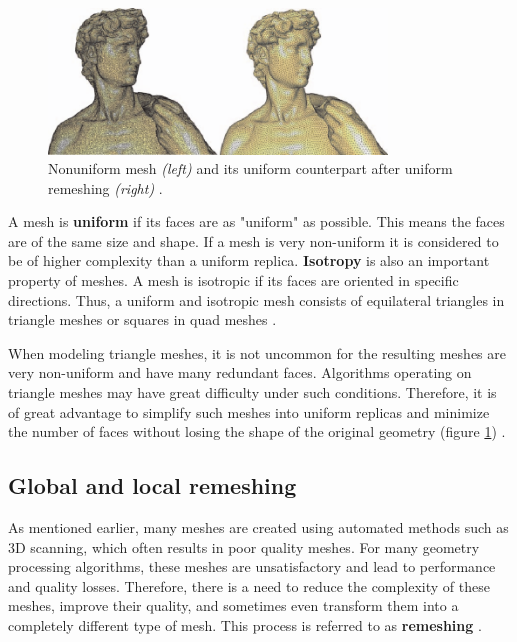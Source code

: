 \documentclass{ACGSeminar}
\begin{document}
\begin{figure}[htb!]
	\begin{centering}
		\includegraphics[width=9cm]{img/Uniform-Mesh.png}\par
	\end{centering}
	\caption{Nonuniform mesh \textit{(left)} and its uniform counterpart after uniform remeshing \textit{(right)} \cite{alliez2008recent}.}
	\label{fig:uniform-mesh}
\end{figure}

A mesh is \textbf{uniform} if its faces are as "uniform" as possible. This means the faces are of the same size and shape. If a mesh is very non-uniform it is considered to be of higher complexity than a uniform replica. \textbf{Isotropy} is also an important property of meshes. A mesh is isotropic if its faces are oriented in specific directions. Thus, a uniform and isotropic mesh consists of equilateral triangles in triangle meshes or squares in quad meshes \cite{alliez2003isotropic,surazhsky2003isotropic}.

When modeling triangle meshes, it is not uncommon for the resulting meshes are very non-uniform and have many redundant faces. Algorithms operating on triangle meshes may have great difficulty under such conditions. Therefore, it is of great advantage to simplify such meshes into uniform replicas and minimize the number of faces without losing the shape of the original geometry (figure \ref{fig:uniform-mesh}) \cite{jakob2015instant}.


\subsection{Global and local remeshing}\label{global-local-remeshing}
As mentioned earlier, many meshes are created using automated methods such as 3D scanning, which often results in poor quality meshes. For many geometry processing algorithms, these meshes are unsatisfactory and lead to performance and quality losses. Therefore, there is a need to reduce the complexity of these meshes, improve their quality, and sometimes even transform them into a completely different type of mesh. This process is referred to as \textbf{remeshing} \cite{alliez2008recent}.\bigskip
\end{document}
